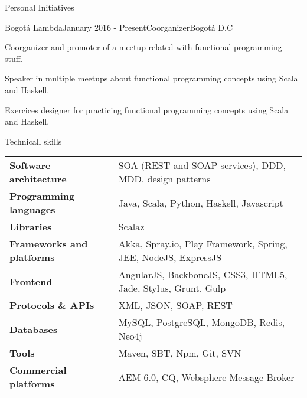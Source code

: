 \documentclass[spanish]{resume}
\begin{document}
\begin{rSection}{Personal Initiatives}

\begin{rSubsection}{Bogot\'a Lambda}{January 2016 - Present}{Coorganizer}{Bogot\'a D.C}
\item Coorganizer and promoter of a meetup related with functional programming stuff.
\item Speaker in multiple meetups about functional programming concepts using Scala and Haskell.
\item Exercices designer for practicing functional programming concepts using Scala and Haskell.
\end{rSubsection}

\end{rSection}



\begin{rSection}{Technicall skills}

\begin{tabular}{ @{} >{\bfseries}l @{\hspace{6ex}} l }
Software architecture & SOA (REST and SOAP services), DDD, MDD, design patterns \\
Programming languages & Java, Scala, Python, Haskell, Javascript\\
Libraries & Scalaz  \\
Frameworks and platforms & Akka, Spray.io, Play Framework, Spring, JEE, NodeJS, ExpressJS \\
Frontend & AngularJS, BackboneJS, CSS3, HTML5, Jade, Stylus, Grunt, Gulp \\
Protocols \& APIs & XML, JSON, SOAP, REST \\
Databases & MySQL, PostgreSQL, MongoDB, Redis, Neo4j \\
Tools & Maven, SBT, Npm, Git, SVN \\
Commercial platforms & AEM 6.0, CQ, Websphere Message Broker \\

\end{tabular}

\end{rSection}
\end{document}
